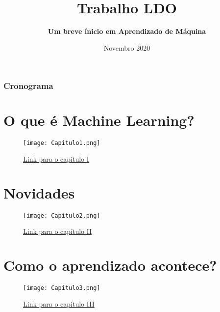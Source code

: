 \documentclass{beamer}
\title[LDO] %
{\textbf{Trabalho LDO}}
\subtitle{\textbf{Um breve ínicio em Aprendizado de Máquina}}
\institute[PUC] %
{
  \inst{1}%
  \emph{Pontifícia Universidade Católica de Minas Gerais}
  \\PUC-MG
}
\date[2020] %
{Novembro 2020}
\begin{document}
\frame{\titlepage}


\begin{frame}
    \frametitle{Cronograma}
    \tableofcontents
\end{frame}

\section{O que é Machine Learning?}

\begin{frame}

    \begin{figure}[ht]
        \centering
        \texttt{[image: Capitulo1.png]}
        \caption{\href{run:./capitulos/Capitulo_01/Capitulo1.pdf}{Link para o capítulo I}}
    \end{figure}

\end{frame}

\section{Novidades}

\begin{frame}

    \begin{figure}[ht]
        \centering
        \texttt{[image: Capitulo2.png]}
        \caption{\href{run:./capitulos/Capitulo_02/Capitulo2.pdf}{Link para o capítulo II}}
    \end{figure}

\end{frame}

\section{Como o aprendizado acontece?}

\begin{frame}

    \begin{figure}[ht]
        \centering
        \texttt{[image: Capitulo3.png]}
        \caption{\href{run:./capitulos/Capitulo_3/Capitulo03.pdf}{Link para o capítulo III}}
    \end{figure}

\end{frame}
\end{document}
